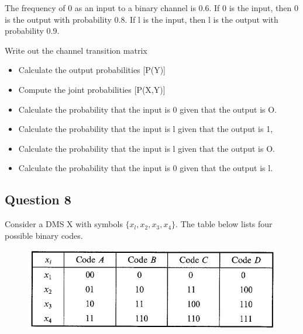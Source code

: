 \documentclass[a4paper,12pt]{article}
\begin{document}
The frequency of 0 as an input to a binary channel is 0.6. If 0 is the input, then 0 is the output with probability 0.8. If l is the input, then l is the output with probability 0.9.

Write out the channel transition matrix

\begin{itemize}
\item	Calculate the output probabilities [P(Y)] 
\item	Compute the joint probabilities [P(X,Y)]
\item	Calculate the probability that the input is 0 given that the output is O. 
\item Calculate the probability that the input is l given that the output is 1, 
\item	Calculate the probability that the input is l given that the output is O.
\item	Calculate the probability that the input is 0 given that the output is l. 
\end{itemize}


\subsection*{Question 8 }
Consider a DMS X with symbols $\{x_l,x_2,x_3,x_4\}$. The table below lists four possible
binary codes.

\begin{figure}[h!]
\centering
\includegraphics[width=0.7\linewidth]{./12ACodes}
\caption{}
\label{fig:12ACodes}
\end{figure}
\end{document}
